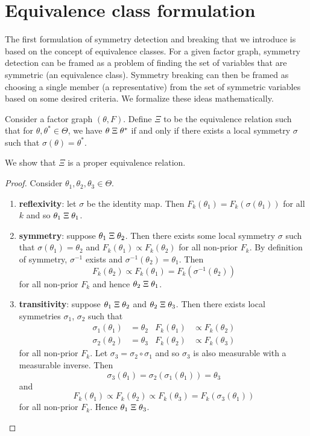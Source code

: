 

\section{Equivalence class formulation}

The first formulation of symmetry detection and breaking that we introduce is based on the concept of equivalence classes. For a given factor graph, symmetry detection can be framed as a problem of finding the set of variables that are symmetric (an equivalence class). Symmetry breaking can then be framed as choosing a single member (a representative) from the set of symmetric variables based on some desired criteria. We formalize these ideas mathematically.

\begin{defn}
Consider a factor graph $(\theta,F)$. Define $\Xi$ to be the equivalence relation such that for $\theta,\theta^*\in\Theta$, we have $\theta\;\Xi\;\theta^*$ if and only if there exists a local symmetry $\sigma$ such that $\sigma(\theta)=\theta^*$.
\end{defn}

\noindent We show that $\Xi$ is a proper equivalence relation.

\begin{proof}
Consider $\theta_1, \theta_2, \theta_3\in\Theta$.
\begin{enumerate}

\item
\textbf{reflexivity}: let $\sigma$ be the identity map. Then $F_k(\theta_1) = F_k(\sigma(\theta_1))$ for all $k$ and so $\theta_1\;\Xi\;\theta_1$.

\item
\textbf{symmetry}: suppose $\theta_1\;\Xi\;\theta_2$. Then there exists some local symmetry $\sigma$ such that $\sigma(\theta_1)=\theta_2$ and $F_k(\theta_1) \propto F_k(\theta_2)$ for all non-prior $F_k$. By definition of symmetry, $\sigma^{-1}$ exists and $\sigma^{-1}(\theta_2)=\theta_1$. Then
\[
F_k(\theta_2) \propto F_k(\theta_1) = F_k(\sigma^{-1}(\theta_2))
\]
for all non-prior $F_k$ and hence $\theta_2\;\Xi\;\theta_1$.

\item
\textbf{transitivity}: suppose $\theta_1\;\Xi\;\theta_2$ and $\theta_2\;\Xi\;\theta_3$. Then there exists local symmetries $\sigma_1$, $\sigma_2$ such that
\begin{align*}
\sigma_1(\theta_1)&=\theta_2 & F_k(\theta_1)&\propto F_k(\theta_2) \\
\sigma_2(\theta_2)&=\theta_3 & F_k(\theta_2)&\propto F_k(\theta_3)
\end{align*}
for all non-prior $F_k$. Let $\sigma_3=\sigma_2\circ\sigma_1$ and so $\sigma_3$ is also measurable with a measurable inverse. Then
\[
\sigma_3(\theta_1)=\sigma_2(\sigma_1(\theta_1)) = \theta_3
\]
and
\[
F_k(\theta_1) \propto F_k(\theta_2) \propto F_k(\theta_3) = F_k(\sigma_3(\theta_1))
\]
for all non-prior $F_k$. Hence $\theta_1\;\Xi\;\theta_3$.

\end{enumerate}
\end{proof}

